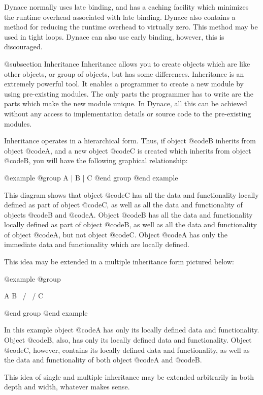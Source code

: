 Dynace normally uses late binding, and has a caching facility which minimizes
the runtime overhead associated with late binding.  Dynace also contains
a method for reducing the runtime overhead to virtually zero.  This
method may be used in tight loops.  Dynace can also use early binding,
however, this is discouraged.

@subsection Inheritance
Inheritance allows you to create objects which are like other objects,
or group of objects, but has some differences.  Inheritance is an
extremely powerful tool.  It enables a programmer to create a new
module by using pre-existing modules.  The only parts the programmer has
to write are the parts which make the new module unique.  In Dynace, all
this can be achieved without any access to implementation details or
source code to the pre-existing modules.

Inheritance operates in a hierarchical form.  Thus, if object @code{B}
inherits from object @code{A}, and a new object @code{C} is created
which inherits from object @code{B}, you will have the following
graphical relationship:


@example
@group
                       A
                       |
                       B
                       |
                       C
@end group
@end example

This diagram shows that object @code{C} has all the data and
functionality locally defined as part of object @code{C}, as well as all
the data and functionality of objects @code{B} and @code{A}.  Object
@code{B} has all the data and functionality locally defined as part of
object @code{B}, as well as all the data and functionality of object
@code{A}, but not object @code{C}.  Object @code{A} has only the
immediate data and functionality which are locally defined.

This idea may be extended in a multiple inheritance form pictured below:

@example
@group

               A     B
                \   /
                 \ /
                  C

@end group
@end example

In this example object @code{A} has only its locally defined data and
functionality.  Object @code{B}, also, has only its locally defined
data and functionality.  Object @code{C}, however, contains its locally
defined data and functionality, as well as the data and functionality of both
object @code{A} and @code{B}.

This idea of single and multiple inheritance may be extended arbitrarily
in both depth and width, whatever makes sense.

